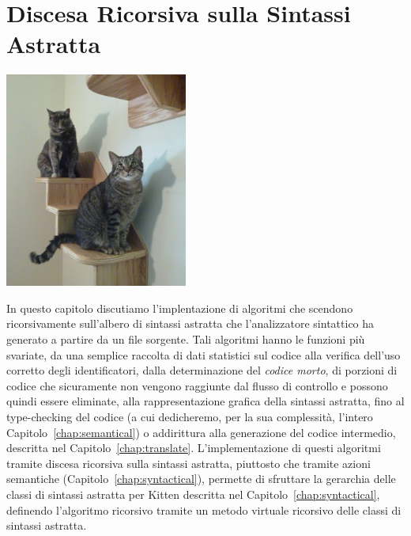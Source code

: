 \chapter{Discesa Ricorsiva sulla Sintassi Astratta}
  \label{chap:recursive_descent}
%
\begin{center}
\includegraphics[width=6cm]{paw.jpg}
\end{center}
%
In questo capitolo discutiamo l'implentazione di algoritmi che
scendono ricorsivamente sull'albero di sintassi astratta che l'analizzatore
sintattico ha generato a partire da un file sorgente. Tali algoritmi
hanno le funzioni pi\`u svariate, da una semplice raccolta di dati statistici
sul codice alla verifica dell'uso corretto degli identificatori,
dalla determinazione del \emph{codice morto}, \cioe di porzioni di codice
che sicuramente non vengono raggiunte dal flusso di controllo e possono
quindi essere eliminate,
alla rappresentazione grafica della sintassi astratta, fino
al type-checking del codice (a cui dedicheremo,
per la sua complessit\`a, l'intero Capitolo~\ref{chap:semantical})
o addirittura alla generazione del codice intermedio,
descritta nel Capitolo~\ref{chap:translate}.
L'implementazione di questi algoritmi tramite discesa ricorsiva
sulla sintassi astratta, piuttosto
che tramite azioni semantiche (Capitolo~\ref{chap:syntactical}),
permette di sfruttare la gerarchia delle classi di sintassi astratta per
Kitten descritta nel Capitolo~\ref{chap:syntactical}, definendo l'algoritmo
ricorsivo tramite un metodo virtuale ricorsivo delle classi di sintassi
astratta.


